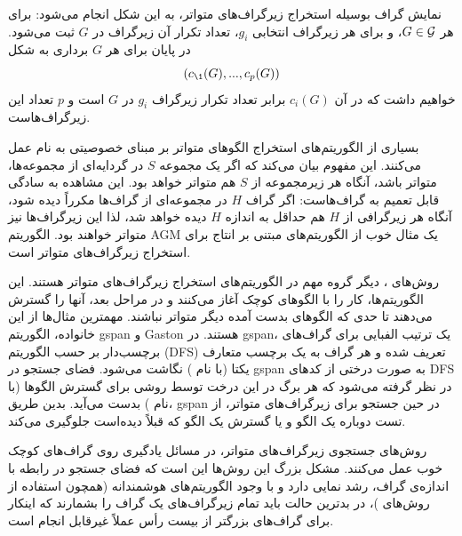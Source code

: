 نمایش گراف بوسیله استخراج زیرگراف‌های متواتر، به این شکل انجام می‌شود: برای هر $G \in \mathcal{G}$، و برای هر زیرگراف انتخابی $g_i$، تعداد تکرار آن زیرگراف در $G$ ثبت می‌شود. در پایان برای هر $G$ برداری به شکل
\begin{equation*}
(c_\1(G),...,c_p(G))
\end{equation*}
خواهیم داشت که در آن $c_i(G)$ برابر تعداد تکرار زیرگراف $g_i$ در $G$ است و $p$ تعداد این زیرگراف‌هاست.

بسیاری از الگوریتم‌های استخراج الگوهای متواتر بر مبنای خصوصیتی به نام  عمل می‌کنند. این مفهوم بیان می‌کند که اگر یک مجموعه $S$ در گردایه‌ای از مجموعه‌ها، متواتر باشد، آنگاه هر زیرمجموعه از $S$ هم متواتر خواهد بود. این مشاهده به سادگی قابل تعمیم به گراف‌هاست: اگر گراف $H$ در مجموعه‌ای از گراف‌ها مکرراً دیده شود، آنگاه هر زیرگرافی از $H$ هم حداقل به اندازه $H$ دیده خواهد شد، لذا این زیرگراف‌ها نیز متواتر خواهند بود. الگوریتم AGM  یک مثال خوب از الگوریتم‌های مبتنی بر انتاج برای استخراج زیرگراف‌های متواتر است.

روش‌های ، دیگر گروه مهم در الگوریتم‌های استخراج زیرگراف‌های متواتر هستند. این الگوریتم‌ها، کار را با الگوهای کوچک آغاز می‌کنند و در مراحل بعد، آنها را گسترش می‌دهند تا حدی که الگوهای بدست آمده دیگر متواتر نباشند. مهمترین مثال‌ها از این خانواده، الگوریتم gspan  و Gaston  هستند. در gspan، یک ترتیب الفبایی برای گراف‌های برچسب‌دار بر حسب الگوریتم  (DFS) تعریف شده و هر گراف به یک برچسب متعارف یکتا (با نام ) نگاشت می‌شود. فضای جستجو در gspan به صورت درختی از کدهای DFS در نظر گرفته می‌شود که هر برگ در این درخت توسط روشی برای گسترش الگوها (با نام ) بدست می‌آید. بدین طریق، gspan در حین جستجو برای زیرگراف‌های متواتر، از تست دوباره یک الگو و یا گسترش یک الگو که قبلاً دیده‌است جلوگیری می‌کند.

روش‌های جستجوی زیرگراف‌های متواتر، در مسائل یادگیری روی گراف‌های کوچک خوب عمل می‌کنند. مشکل بزرگ این روش‌ها این است که فضای جستجو در رابطه با اندازه‌ی گراف، رشد نمایی دارد و با وجود الگوریتم‌های هوشمندانه (همچون استفاده از روش‌های )، در بدترین حالت باید تمام زیرگراف‌های یک گراف را بشمارند که اینکار برای گراف‌های بزرگتر از بیست رأس عملاً غیرقابل انجام است.

